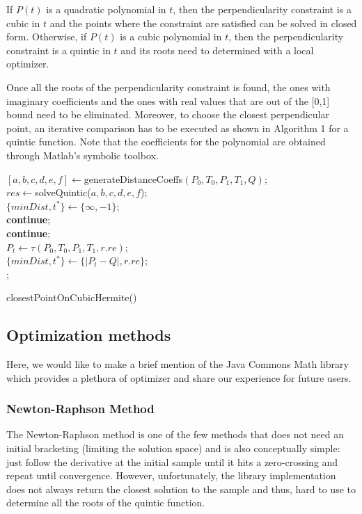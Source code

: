 \documentclass[journal, letterpaper]{IEEEtran}
\begin{document}
If $P(t)$ is a quadratic polynomial in $t$, then the perpendicularity constraint is a cubic in $t$ and
the points where the constraint are satisfied can be solved in closed form. Otherwise, if $P(t)$ is a 
cubic polynomial in $t$, then the perpendicularity constraint is a quintic in $t$ and its roots
need to determined with a local optimizer. 

Once all the roots of the perpendicularity constraint is found, the ones with imaginary coefficients
and the ones with real values that are out of the [0,1] bound need to be eliminated. Moreover, to
choose the closest perpendicular point, an iterative comparison has to be executed as shown in 
Algorithm 1 for a quintic function. Note that the coefficients for the polynomial are obtained
through Matlab's symbolic toolbox. 

\begin{algorithm}[ht!]
  $[a,b,c,d,e,f] \leftarrow $generateDistanceCoeffs$(P_0,T_0,P_1,T_1,Q)$; \\
  $res \leftarrow $solveQuintic($a,b,c,d,e,f$); \\
  $\{minDist, t^*\} \leftarrow \{\infty,-1\}$;\\
   {
     \textbf{continue}; \\
     \textbf{continue}; \\
    $P_t \leftarrow \tau(P_0,T_0,P_1,T_1,r.re)$; \\
     {
      $\{minDist, t^*\} \leftarrow \{|P_t - Q|, r.re\}$;\\
    }
  }
  ;
  \caption{closestPointOnCubicHermite()}
\end{algorithm}

\subsection{Optimization methods}

Here, we would like to make a brief mention of the Java Commons Math library which provides a 
plethora of optimizer and share our experience for future users. 

\subsubsection{Newton-Raphson Method}
The Newton-Raphson method is one of the few methods that does not need an initial bracketing (limiting
the solution space) and is also conceptually simple: just follow the derivative at the initial sample
until it hits a zero-crossing and repeat until convergence. However, unfortunately, the library
implementation does not always return the closest solution to the sample and thus, hard to use to 
determine all the roots of the quintic function.
\end{document}
